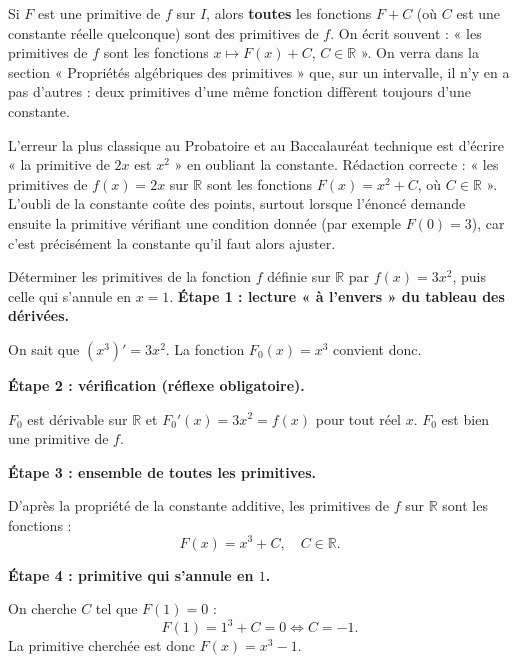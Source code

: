 \documentclass[11pt]{article}
\newcounter{popsec}
\newcounter{popsub}
\newcommand{\courssub}[1]{%
  \stepcounter{popsub}%
  \par\vspace{9pt}\noindent{\popxbold\fontsize{11.5}{13}\selectfont\color{popink}{\color{poporange}\thepopsec.\thepopsub}\hspace{6pt}#1}\par\nopagebreak\vspace{4pt}
}
\begin{document}
\begin{aretenir}
Si $F$ est une primitive de $f$ sur $I$, alors \textbf{toutes} les fonctions $F+C$ (où $C$ est une constante réelle quelconque) sont des primitives de $f$. On écrit souvent : « les primitives de $f$ sont les fonctions $x\mapsto F(x)+C$, $C\in\mathbb{R}$ ». On verra dans la section « Propriétés algébriques des primitives » que, sur un intervalle, il n'y en a pas d'autres : deux primitives d'une même fonction diffèrent toujours d'une constante.
\end{aretenir}

\begin{attention}
L'erreur la plus classique au Probatoire et au Baccalauréat technique est d'écrire « la primitive de $2x$ est $x^2$ » en oubliant la constante. Rédaction correcte : « les primitives de $f(x)=2x$ sur $\mathbb{R}$ sont les fonctions $F(x)=x^2+C$, où $C\in\mathbb{R}$ ». L'oubli de la constante coûte des points, surtout lorsque l'énoncé demande ensuite la primitive vérifiant une condition donnée (par exemple $F(0)=3$), car c'est précisément la constante qu'il faut alors ajuster.
\end{attention}

\courssub{Exemple chiffré détaillé}

\begin{exoresolu}[Primitive de $f(x)=3x^2$ sur $\mathbb{R}$]
Déterminer les primitives de la fonction $f$ définie sur $\mathbb{R}$ par $f(x)=3x^2$, puis celle qui s'annule en $x=1$.
\tcblower
\textbf{Étape 1 : lecture « à l'envers » du tableau des dérivées.}

On sait que $(x^3)'=3x^2$. La fonction $F_0(x)=x^3$ convient donc.

\textbf{Étape 2 : vérification (réflexe obligatoire).}

$F_0$ est dérivable sur $\mathbb{R}$ et $F_0'(x)=3x^2=f(x)$ pour tout réel $x$. $F_0$ est bien une primitive de $f$.

\textbf{Étape 3 : ensemble de toutes les primitives.}

D'après la propriété de la constante additive, les primitives de $f$ sur $\mathbb{R}$ sont les fonctions :
\[ F(x)=x^3+C,\quad C\in\mathbb{R}. \]

\textbf{Étape 4 : primitive qui s'annule en $1$.}

On cherche $C$ tel que $F(1)=0$ :
\[ F(1)=1^3+C=0 \iff C=-1. \]
La primitive cherchée est donc $F(x)=x^3-1$.
\end{exoresolu}
\end{document}
